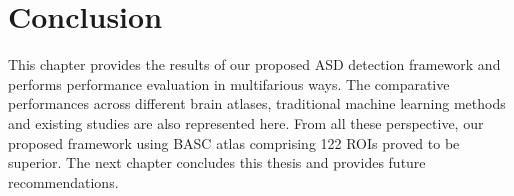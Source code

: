 \section{Conclusion}
This chapter provides the results of our proposed ASD detection framework and performs
performance evaluation in multifarious ways. The comparative performances across different
brain atlases, traditional machine learning methods and existing studies are also represented
here. From all these perspective, our proposed framework using BASC atlas comprising 122
ROIs proved to be superior. The next chapter concludes this thesis and provides future
recommendations.